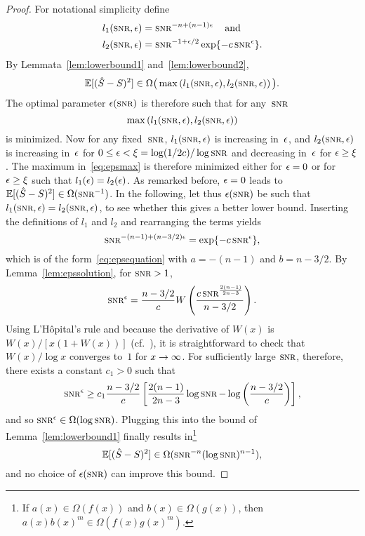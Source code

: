 \begin{proof}
  For notational simplicity define
  \begin{align*}
    l_1(\snr, \e) &= \snr^{-n+(n-1)\e} \quad\text{and} \\
    l_2(\snr,\e) &= \snr^{-1+\e/2} \exp\{-c\snr^\e\}.
  \end{align*}
  By Lemmata~\ref{lem:lowerbound1} and~\ref{lem:lowerbound2},
  \begin{equation*}
    \mse \in \Omega\big(\max \left( l_1(\snr,\e), l_2(\snr,\e) \right) \big).
  \end{equation*}
  The optimal parameter $\e(\snr)$ is therefore such that for
  any~$\snr$
  \begin{equation}
    \label{eq:epsmax}
    \max\left( l_1(\snr,\e), l_2(\snr,\e) \right)
  \end{equation}
  is minimized. Now for any fixed~$\snr$, $l_1(\snr,\e)$ is increasing in~$\epsilon$,
  and $l_2(\snr,\e)$ is increasing in~$\epsilon$ for $0 \le \e < \xi =
  \log(1/2c)/\log\snr$ and decreasing in~$\epsilon$ for $\epsilon \ge \xi$.  The maximum
  in~\eqref{eq:epsmax} is therefore minimized either for $\epsilon = 0$ or for $\epsilon \ge
  \xi$ such that $l_1(\epsilon) = l_2(\epsilon)$. As remarked before, $\epsilon = 0$ leads to
  $\mse \in \Omega(\snr^{-1})$. In the following, let thus $\e(\snr)$ be such
  that $l_1(\snr,\e) = l_2(\snr, \e)$, to see whether this gives a better lower
  bound.  Inserting the definitions of $l_1$ and $l_2$ and rearranging the terms
  yields
  \begin{equation*}
    \snr^{-(n-1) + (n-3/2)\e} = \exp\{-c\snr^\e\},
  \end{equation*}
  which is of the form~\eqref{eq:epsequation} with $a = -(n-1)$ and $b = n-3/2$.
  By Lemma~\ref{lem:epssolution}, for $\snr > 1$,
  \begin{equation*}
    \snr^\e = \frac{n-3/2}{c}
    W\left( \frac{c\snr^{\frac{2(n-1)}{2n-3}}}{n-3/2} \right).
  \end{equation*}
  Using L'H\^opital's rule and because the derivative of
  $W(x)$ is $W(x)/[x(1 + W(x))]$ (cf.~\cite{CorlessGHJK1996}), it is
  straightforward to check that $W(x)/\log x$ converges to~$1$ for $x \rightarrow
  \infty$.  For sufficiently large $\snr$, therefore, there exists a constant
  $c_1 > 0$ such that
  \begin{equation*}
    \snr^\e \ge c_1 \frac{n-3/2}{c} \left[ \frac{2(n-1)}{2n-3}\log\snr -
    \log\left(\frac{n-3/2}{c}\right)
    \right],
  \end{equation*}
  and so $\snr^\e \in \Omega(\log\snr)$. Plugging this into the bound of
  Lemma~\ref{lem:lowerbound1} finally results in\footnote{If $a(x) \in
  \Omega(f(x))$ and $b(x) \in \Omega(g(x))$, then $a(x)b(x)^m \in
  \Omega(f(x)g(x)^m)$.}
  \begin{equation*}
    \mse \in \Omega(\snr^{-n}(\log\snr)^{n-1}),
  \end{equation*}
  and no choice of $\e(\snr)$ can improve this bound.
\end{proof}


